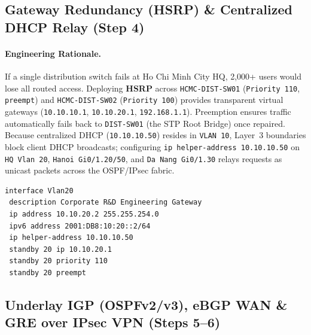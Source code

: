 \subsection{Gateway Redundancy (HSRP) \& Centralized DHCP Relay (Step 4)}
\paragraph{Engineering Rationale.}
If a single distribution switch fails at Ho Chi Minh City HQ, 2,000+ users would lose all routed access. Deploying \textbf{HSRP} across \texttt{HCMC-DIST-SW01} (\texttt{Priority 110}, \texttt{preempt}) and \texttt{HCMC-DIST-SW02} (\texttt{Priority 100}) provides transparent virtual gateways (\texttt{10.10.10.1}, \texttt{10.10.20.1}, \texttt{192.168.1.1}). Preemption ensures traffic automatically fails back to \texttt{DIST-SW01} (the STP Root Bridge) once repaired. Because centralized DHCP (\texttt{10.10.10.50}) resides in \texttt{VLAN 10}, Layer~3 boundaries block client DHCP broadcasts; configuring \texttt{ip helper-address 10.10.10.50} on \texttt{HQ Vlan 20}, \texttt{Hanoi Gi0/1.20/50}, and \texttt{Da Nang Gi0/1.30} relays requests as unicast packets across the OSPF/IPsec fabric.

\begin{lstlisting}[style=CiscoCLI, caption={HSRP Active Gateway and DHCP Relay Configuration on HCMC-DIST-SW01.}]
interface Vlan20
 description Corporate R&D Engineering Gateway
 ip address 10.10.20.2 255.255.254.0
 ipv6 address 2001:DB8:10:20::2/64
 ip helper-address 10.10.10.50
 standby 20 ip 10.10.20.1
 standby 20 priority 110
 standby 20 preempt
\end{lstlisting}

\subsection{Underlay IGP (OSPFv2/v3), eBGP WAN \& GRE over IPsec VPN (Steps 5--6)}
